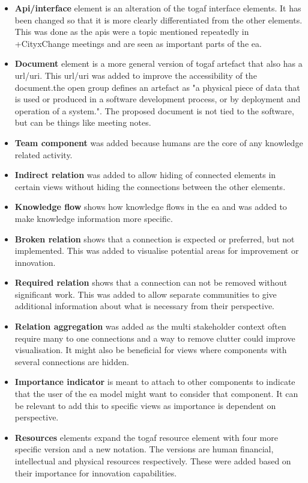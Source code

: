 \begin{itemize}
    \item \textbf{Api/interface} element is an alteration of the \gls{togaf} interface elements. It has been changed so that it is more clearly differentiated from the other elements. This was done as the \glspl{api} were a topic mentioned repeatedly in +CityxChange meetings and are seen as important parts of the \gls{ea}.
    \item \textbf{Document} element is a  more general version of \gls{togaf} artefact that also has a \gls{url}/\gls{uri}. This \gls{url}/\gls{uri} was added to improve the accessibility of the document.\Gls{the open group} defines an artefact as "a physical piece of data that is used or produced in a software development process, or by deployment and operation of a system."\cite{archilayer}. The proposed document is not tied to the software, but can be things like meeting notes.
    \item \textbf{Team component} was added because humans are the core of any knowledge related activity.
    \item \textbf{Indirect relation} was added to allow hiding of connected elements in certain views without hiding the connections between the other elements.
    \item \textbf{Knowledge flow} shows how knowledge flows in the \gls{ea} and was added to make knowledge information more specific.
    \item \textbf{Broken relation} shows that a connection is expected or preferred, but not implemented. This was added to visualise potential areas for improvement or innovation.
    \item \textbf{Required relation} shows that a connection can not be removed without significant work. This was added to allow separate communities to give additional information about what is necessary from their perspective.
    \item \textbf{Relation aggregation} was added as the multi stakeholder context often require many to one connections and a way to remove clutter could improve visualisation. It might also be beneficial for views where components with several connections are hidden. 
    \item \textbf{Importance indicator} is meant to attach to other components to indicate that the user of the \gls{ea} model might want to consider that component. It can be relevant to add this to specific views as importance is dependent on perspective.
    \item \textbf{Resources} elements expand the \gls{togaf} resource element with four more specific version and a new notation. The versions are human financial, intellectual and physical resources respectively. These were added based on their importance for innovation capabilities.

\end{itemize}

